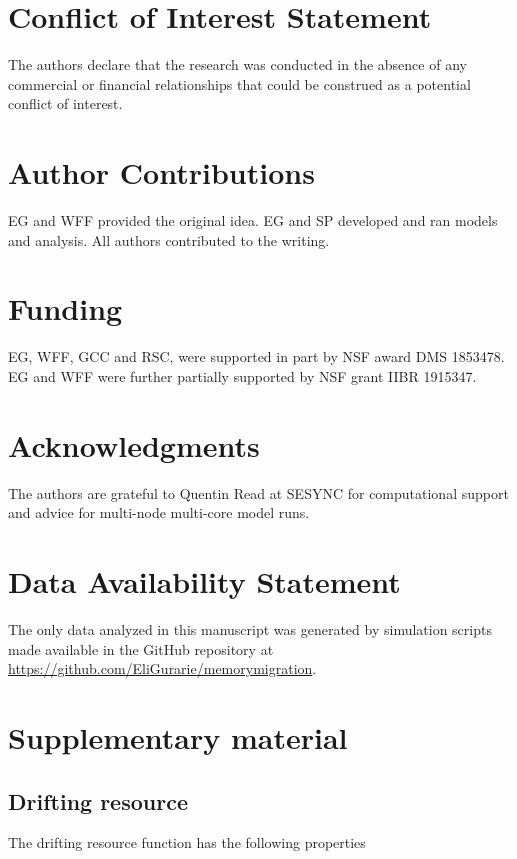 \documentclass[utf8]{frontiersSCNS} %
\begin{document}
	\section*{Conflict of Interest Statement}
	
	The authors declare that the research was conducted in the absence of any commercial or financial relationships that could be construed as a potential conflict of interest.
	
	\section*{Author Contributions}
	
	EG and WFF provided the original idea. EG and SP developed and ran models and analysis. All authors contributed to the writing. 
	
	\section*{Funding}
	
	EG, WFF, GCC and RSC, were supported in part by NSF award DMS 1853478. EG and WFF were further partially supported by NSF grant IIBR 1915347. 
	
	\section*{Acknowledgments}
	The authors are grateful to Quentin Read at SESYNC for computational support and advice for multi-node multi-core model runs. 
	
	
	\section*{Data Availability Statement}
	
	The only data analyzed in this manuscript was generated by simulation scripts made available in the GitHub repository at \url{https://github.com/EliGurarie/memorymigration}. 
	
	 
	
	
	\clearpage
	\appendix
	
	\section{Supplementary material}
	\normalsize
	
	\subsection{Drifting resource}
	The drifting resource function has the following properties
	
\end{document}
